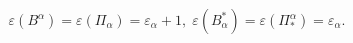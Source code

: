 \begin{equation}
\varepsilon(B^{\alpha})=\varepsilon(\Pi_{\alpha})=\varepsilon_{\alpha
}+1,\;\varepsilon(B_{\alpha}^{\ast})=\varepsilon(\Pi_{\ast}^{\alpha
})=\varepsilon_{\alpha}.\label{3.12}%
\end{equation}


